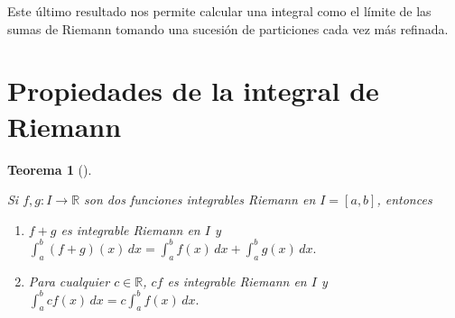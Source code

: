 \documentclass[
  a4paper,
]{scrreport}
\theoremstyle{definition}
\theoremstyle{plain}
\theoremstyle{definition}
\theoremstyle{definition}
\theoremstyle{plain}
\newtheorem{theorem}{Teorema}[chapter]
\theoremstyle{plain}
\theoremstyle{remark}
\begin{document}
\begin{tcolorbox}[enhanced jigsaw, leftrule=.75mm, colbacktitle=quarto-callout-important-color!10!white, toprule=.15mm, opacityback=0, opacitybacktitle=0.6, toptitle=1mm, breakable, bottomtitle=1mm, colframe=quarto-callout-important-color-frame, rightrule=.15mm, titlerule=0mm, title=\textcolor{quarto-callout-important-color}{\faExclamation}\hspace{0.5em}{Importante}, arc=.35mm, left=2mm, bottomrule=.15mm, colback=white, coltitle=black]

Este último resultado nos permite calcular una integral como el límite
de las sumas de Riemann tomando una sucesión de particiones cada vez más
refinada.

\end{tcolorbox}

\section{Propiedades de la integral de
Riemann}\label{propiedades-de-la-integral-de-riemann}

\begin{theorem}[]\protect\hypertarget{thm-linealidad-integral-riemann}{}\label{thm-linealidad-integral-riemann}

Si \(f,g:I\to\mathbb{R}\) son dos funciones integrables Riemann en
\(I=[a,b]\), entonces

\begin{enumerate}
\def\labelenumi{\alph{enumi}.}
\item
  \(f+g\) es integrable Riemann en \(I\) y
  \(\int_a^b (f+g)(x)\, dx = \int_a^b f(x)\,dx + \int_a^b g(x)\,dx.\)
\item
  Para cualquier \(c\in\mathbb{R}\), \(cf\) es integrable Riemann en
  \(I\) y \(\int_a^b cf(x)\, dx = c\int_a^b f(x)\,dx.\)
\end{enumerate}

\end{theorem}
\end{document}
